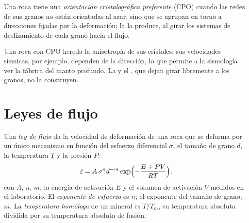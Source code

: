 \begin{definition}\label{def:b3:deformation-mechanisms:cpo}
Una roca tiene una \emph{orientación cristalográfica preferente}
(CPO) cuando las redes de sus granos no están orientadas
al azar, sino que se agrupan en torno a direcciones fijadas por la deformación; la  la produce, al girar los sistemas de deslizamiento de cada grano hacia el flujo.
\end{definition}

Una roca con CPO hereda la anisotropía de sus cristales: sus velocidades sísmicas,
por ejemplo, dependen de la dirección, lo que permite a la sismología ver la fábrica del
manto profundo. La  y el , que dejan girar
libremente a los granos, no la construyen.

\section{Leyes de flujo}

\begin{definition}\label{def:b3:deformation-mechanisms:flow-law}
Una \emph{ley de flujo} da la velocidad de deformación de una roca que se deforma
por un único mecanismo en función del esfuerzo diferencial $\sigma$, el tamaño de grano
$d$, la temperatura $T$ y la presión $P$:
\[
  \dot\varepsilon = A\,\sigma^nd^{-m}\exp\Bigl(-\frac{E + PV}{RT}\Bigr),
\]
con $A$, $n$, $m$, la energía de activación $E$ y el volumen de activación $V$
medidos en el laboratorio. El \emph{exponente de esfuerzo}
es $n$; el exponente del tamaño de grano, $m$. La \emph{temperatura
homóloga} de un mineral es $T/T_m$, su temperatura absoluta
dividida por su temperatura absoluta de fusión.
\end{definition}

